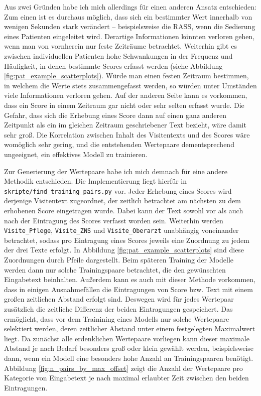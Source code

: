 Aus zwei Gründen habe ich mich allerdings für einen anderen Ansatz entschieden: Zum einen ist es durchaus möglich, dass sich ein bestimmter Wert innerhalb von wenigen Sekunden stark verändert -- beispielsweise die RASS, wenn die Sedierung eines Patienten eingeleitet wird. Derartige Informationen könnten verloren gehen, wenn man von vornherein nur feste Zeiträume betrachtet. Weiterhin gibt es zwischen individuellen Patienten hohe Schwankungen in der Frequenz und Häufigkeit, in denen bestimmte Scores erfasst werden (siehe Abbildung \ref{fig:pat_example_scatterplots}). Würde man einen festen Zeitraum bestimmen, in welchem die Werte stets zusammengefasst werden, so würden unter Umständen viele Informationen verloren gehen. Auf der anderen Seite kann es vorkommen, dass ein Score in einem Zeitraum gar nicht oder sehr selten erfasst wurde. Die Gefahr, dass sich die Erhebung eines Score dann auf einen ganz anderen Zeitpunkt als ein im gleichen Zeitraum geschriebener Text bezieht, wäre damit sehr groß. Die Korrelation zwischen Inhalt des Visitentexts und des Scores wäre womöglich sehr gering, und die entstehenden Wertepaare dementsprechend ungeeignet, ein effektives Modell zu trainieren.

Zur Generierung der Wertepaare habe ich mich demnach für eine andere Methodik entschieden. Die Implementierung liegt hierfür in \texttt{skripte/find\_training\_pairs.py} vor. Jeder Erhebung eines Scores wird derjenige Visitentext zugeordnet, der zeitlich betrachtet am nächsten zu dem erhobenen Score eingetragen wurde. Dabei kann der Text sowohl vor als auch nach der Eintragung des Scores verfasst worden sein. Weiterhin werden \texttt{Visite\_Pflege}, \texttt{Visite\_ZNS} und \texttt{Visite\_Oberarzt} unabhängig voneinander betrachtet, sodass pro Eintragung eines Scores jeweils eine Zuordnung zu jedem der drei Texte erfolgt. In Abbildung \ref{fig:pat_example_scatterplots} sind diese Zuordnungen durch Pfeile dargestellt. Beim späteren Training der Modelle werden dann nur solche Trainingspaare betrachtet, die den gewünschten Eingabetext beinhalten. Außerdem kann es auch mit dieser Methode vorkommen, dass in einigen Ausnahmefällen die Eintragungen von Score bzw. Text mit einem großen zeitlichen Abstand erfolgt sind. Deswegen wird für jedes Wertepaar zusätzlich die zeitliche Differenz der beiden Eintragungen gespeichert. Das ermöglicht, dass vor dem Trainining eines Modells nur solche Wertepaare selektiert werden, deren zeitlicher Abstand unter einem festgelegten Maximalwert liegt. Da zunächst alle erdenklichen Wertepaare vorliegen kann dieser maximale Abstand je nach Bedarf besonders groß oder klein gewählt werden, beispielsweise dann, wenn ein Modell eine besonders hohe Anzahl an Trainingspaaren benötigt. Abbildung \ref{fig:n_pairs_by_max_offset} zeigt die Anzahl der Wertepaare pro Kategorie von Eingabetext je nach maximal erlaubter Zeit zwischen den beiden Eintragungen.


